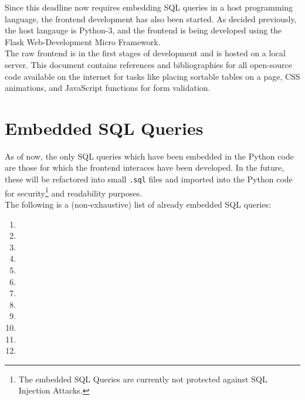 \documentclass[12pt]{report}
\begin{document}
    Since this deadline now requires embedding SQL queries in a host programming language, the frontend development has also been started.
    As decided previously, the host langauge is Python-3, and the frontend is being developed using the Flask Web-Development Micro Framework. \\
    The raw frontend is in the first stages of development and is hosted on a local server.
    This document contains references and bibliographies for all open-source code available on the internet for tasks like placing sortable tables on a page,
    CSS animations, and JavaScript functions for form validation.

    \section*{\Huge Embedded SQL Queries}
    \vspace*{10pt}

    As of now, the only SQL queries which have been embedded in the Python code are those for which the frontend interaces have been developed.
    In the future, these will be refactored into small \texttt{.sql} files and imported into the Python code for security\footnote{
        The embedded SQL Queries are currently not protected against SQL Injection Attacks.
    } and readability purposes.
    \vspace*{10pt} \\
    The following is a (non-exhaustive) list of already embedded SQL queries:

    \begin{enumerate}
        \item 
        \item 
        \item 
        \item 
        \item 
        \item 
        \item 
        \item 
        \item 
        \item 
        \item 
        \item 
    \end{enumerate}
\end{document}
